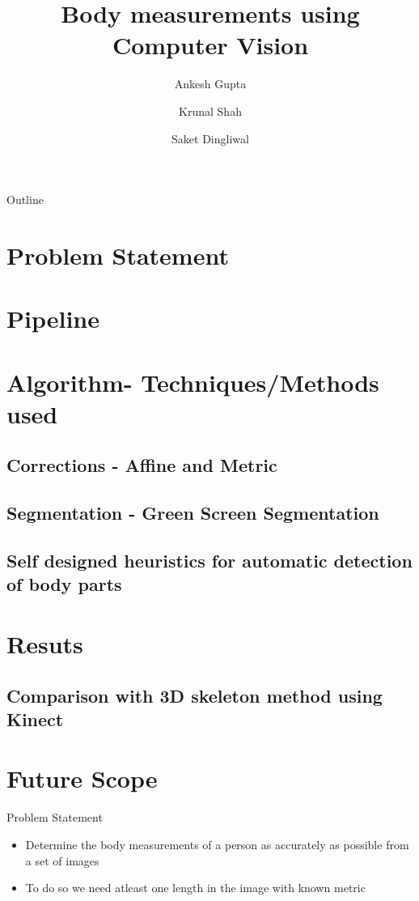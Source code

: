 \documentclass{beamer}
\title{Body measurements using Computer Vision}
\author{Ankesh Gupta \and Krunal Shah \and Saket Dingliwal}
\begin{document}
\begin{frame}
  \titlepage
\end{frame}

\begin{frame}{Outline}
  \tableofcontents
\end{frame}

\section{Problem Statement}
\section{Pipeline}

\section{Algorithm- Techniques/Methods used}
\subsection{Corrections - Affine and Metric}
\subsection{Segmentation - Green Screen Segmentation}
\subsection{Self designed heuristics for automatic detection of body parts}

\section{Resuts}
\subsection{Comparison with 3D skeleton method using Kinect}

\section{Future Scope}

\begin{frame}{Problem Statement}
  \begin{itemize}
  \item Determine the body measurements of a person as accurately as possible from a set of images
  \end{itemize}
  \bigskip
  \begin{itemize}
  \item To do so we need atleast one length in the image with known metric 
  \end{itemize}
\end{frame}
\end{document}
